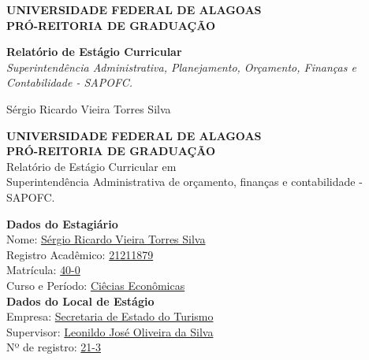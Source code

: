 \documentclass[12pt,a4paper]{article}
\begin{document}
	
	\begin{titlepage}
		\centering
		\large
		\textbf{UNIVERSIDADE FEDERAL DE ALAGOAS} \\
		\textbf{PRÓ-REITORIA DE GRADUAÇÃO} \\
		\vfill
		
		\Huge \textbf{Relatório de Estágio Curricular} \\
		\vspace{0.5cm}
		\LARGE \textit{Superintendência Administrativa, Planejamento, Orçamento, Finanças e Contabilidade - SAPOFC.} \\
		\vfill
		
		\Large Sérgio Ricardo Vieira Torres Silva \\
		\vspace{1.5cm}
	\end{titlepage}
	
	\thispagestyle{empty}
	\begin{center}
		\textbf{UNIVERSIDADE FEDERAL DE ALAGOAS} \\
		\textbf{PRÓ-REITORIA DE GRADUAÇÃO}\\
		\vspace{1cm}
		{Relatório de Estágio Curricular em}\\
		{Superintendência Administrativa de orçamento, finanças e contabilidade - SAPOFC.}
	\end{center}
	
	\vspace{1cm}
	
	\noindent \textbf{Dados do Estagiário} \\
	Nome: \underline{Sérgio Ricardo Vieira Torres Silva\hspace{0,2cm}} \\
	Registro Acadêmico: \underline{21211879\hspace{0,2cm}} \\
	Matrícula: \underline{40-0\hspace{0,2cm}} \\
	Curso e Período: \underline{Ciêcias Econômicas\hspace{0,2cm}} \\
	
	\vspace{0.5cm}
	\noindent \textbf{Dados do Local de Estágio} \\
	Empresa: \underline{Secretaria de Estado do Turismo\hspace{0,2cm}} \\
	Supervisor: \underline{Leonildo José Oliveira da Silva\hspace{0,2cm}} \\
	Nº de registro: \underline{21-3\hspace{0,2cm}} \\
	
\end{document}
